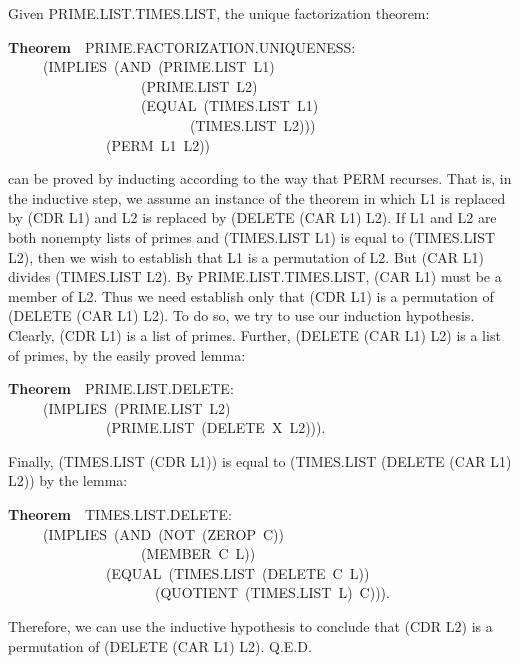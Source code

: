 \documentclass[10pt]{book}
\newenvironment{pubasis}{\begin{flushleft}}{\end{flushleft}}
\newcommand{\axiomordefinition}[1]{\vspace{6pt}\Large\textsf{\textbf{#1}}\normalsize}
\begin{document}
Given PRIME.LIST.TIMES.LIST, the unique factorization theorem:

\begin{pubasis}
\axiomordefinition{Theorem}~~PRIME.FACTORIZATION.UNIQUENESS:\\
~~~~~(IMPLIES~(AND~(PRIME.LIST~L1)\\
~~~~~~~~~~~~~~~~~~~(PRIME.LIST~L2)\\
~~~~~~~~~~~~~~~~~~~(EQUAL~(TIMES.LIST~L1)\\
~~~~~~~~~~~~~~~~~~~~~~~~~~(TIMES.LIST~L2)))\\
~~~~~~~~~~~~~~(PERM~L1~L2))\\
\end{pubasis}
can be
proved  by inducting according to the way that PERM
recurses.  That is, in the inductive step, we  assume
an instance of the  theorem in which L1 is replaced
by (CDR L1) and L2 is replaced by (DELETE (CAR L1) L2).
If L1 and L2 are both nonempty lists of primes and
(TIMES.LIST L1) is equal to (TIMES.LIST L2), then we
wish to establish that L1 is a permutation of L2.
But (CAR L1)
divides (TIMES.LIST L2).  By PRIME.LIST.TIMES.LIST, (CAR L1)
must be a member of L2. Thus we  need  establish only
that (CDR L1) is a permutation of (DELETE (CAR L1) L2).  To do so, we
try to use our induction hypothesis.  Clearly, (CDR L1) is a list
of primes.  Further,
(DELETE (CAR L1) L2) is a list of primes, by the easily proved lemma:
\begin{pubasis}
\axiomordefinition{Theorem}~~PRIME.LIST.DELETE:\\
~~~~~(IMPLIES~(PRIME.LIST~L2)\\
~~~~~~~~~~~~~~(PRIME.LIST~(DELETE~X~L2))).\\
\end{pubasis}
Finally, (TIMES.LIST (CDR L1)) is equal to
(TIMES.LIST (DELETE (CAR L1) L2)) by the lemma:
\begin{pubasis}
\axiomordefinition{Theorem}~~TIMES.LIST.DELETE:\\
~~~~~(IMPLIES~(AND~(NOT~(ZEROP~C))\\
~~~~~~~~~~~~~~~~~~~(MEMBER~C~L))\\
~~~~~~~~~~~~~~(EQUAL~(TIMES.LIST~(DELETE~C~L))\\
~~~~~~~~~~~~~~~~~~~~~(QUOTIENT~(TIMES.LIST~L)~C))).\\
\end{pubasis}
Therefore, we can use the inductive hypothesis to
conclude that (CDR L2) is a permutation of (DELETE (CAR L1) L2).
Q.E.D.
\end{document}
